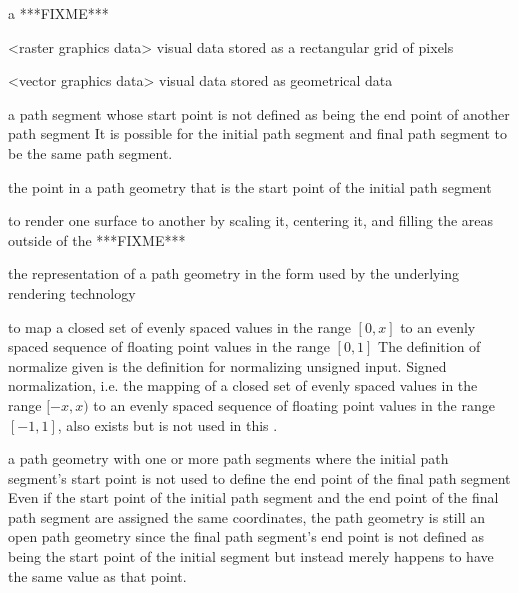 a ***FIXME***

<raster graphics data> visual data stored as a rectangular grid of pixels

<vector graphics data> visual data stored as geometrical data

a path segment whose start point is not defined as being the end point of another path segment
\enternote
It is possible for the initial path segment and final path segment to be the same path segment.
\exitnote

the point in a path geometry that is the start point of the initial path segment

to render one surface to another by scaling it, centering it, and filling the 
areas outside of the  ***FIXME***

the representation of a path geometry in the form used by the underlying rendering technology

to map a closed set of evenly spaced values in the range $[0, x]$ to an evenly spaced sequence of floating point values in the range $[0, 1]$
\enternote
The definition of normalize given is the definition for normalizing unsigned input. Signed normalization, i.e. the mapping of a closed set of evenly spaced values in the range $[-x, x)$ to an evenly spaced sequence of floating point values in the range $[-1, 1]$, also exists but is not used in this \documenttypename.
\exitnote

a path geometry with one or more path segments where the initial path segment's start point is not used to define the end point of the final path segment
\enternote
Even if the start point of the initial path segment and the end point of the final path segment are assigned the same coordinates, the path geometry is still an open path geometry since the final path segment's end point is not defined as being the start point of the initial segment but instead merely happens to have the same value as that point.
\exitnote

